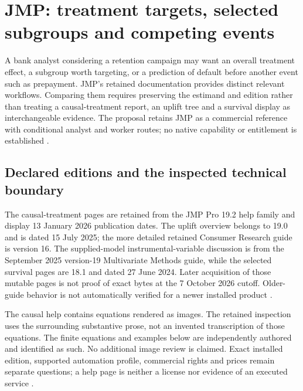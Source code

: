 \section{JMP: treatment targets, selected subgroups and competing events}
\label{sec:exec24-jmp-reuse}

A bank analyst considering a retention campaign may want an overall
treatment effect, a subgroup worth targeting, or a prediction of default
before another event such as prepayment. JMP's retained documentation
provides distinct relevant workflows. Comparing them requires preserving
the estimand and edition rather than treating a causal-treatment report,
an uplift tree and a survival display as interchangeable evidence. The
proposal retains JMP as a commercial reference with conditional analyst
and worker routes; no native capability or entitlement is established
\cite{exec13_ch_jmp_causal,exec13_ch_jmp_uplift,exec14_survival_jmp,
exec24_jmp_choice}.

\subsection{Declared editions and the inspected technical boundary}
The causal-treatment pages are retained from the JMP Pro 19.2 help family
and display 13 January 2026 publication dates. The uplift overview belongs
to 19.0 and is dated 15 July 2025; the more detailed retained Consumer
Research guide is version 16. The supplied-model instrumental-variable
discussion is from the September 2025 version-19 Multivariate Methods
guide, while the selected survival pages are 18.1 and dated 27 June 2024.
Later acquisition of those mutable pages is not proof of exact bytes at
the 7 October 2026 cutoff. Older-guide behavior is not automatically
verified for a newer installed product
\cite{exec13_ch_jmp_causal,exec13_ch_jmp_uplift,exec13_ivrd_jmp,
exec14_survival_jmp}.

The causal help contains equations rendered as images. The retained
inspection uses the surrounding substantive prose, not an invented
transcription of those equations. The finite equations and examples below
are independently authored and identified as such. No additional image
review is claimed. Exact installed edition, supported automation profile,
commercial rights and prices remain separate questions; a help page is
neither a license nor evidence of an executed service
\cite{exec24_jmp_choice}.


